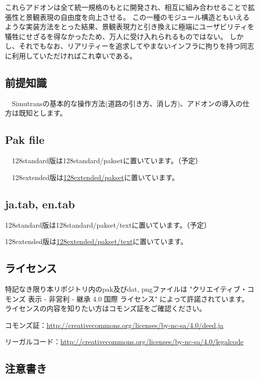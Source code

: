 \documentclass{jarticle}
\begin{document}
これらアドオンは全て統一規格のもとに開発され、相互に組み合わせることで拡張性と景観表現の自由度を向上させる。
この一種のモジュール構造ともいえるような実装方法をとった結果、景観表現力と引き換えに極端にユーザビリティを犠牲にせざるを得なかったため、万人に受け入れられるものではない。
しかし、それでもなお、リアリティーを追求してやまないインフラに拘りを持つ同志に利用していただければこれ幸いである。

\subsection*{前提知識}
　Simutransの基本的な操作方法(道路の引き方、消し方)、アドオンの導入の仕方は既知とします。

\subsection*{Pak file}
　128standard版は128standard/paksetに置いています。（予定）

　128extended版は\href{https://github.com/anoKTOK/Yokubari_roads_set_ver_anoKTOK/tree/main/128extended/pakset}{128extended/pakset}に置いています。

\subsection*{ja.tab, en.tab}
128standard版は128standard/pakset/textに置いています。（予定）

128extended版は\href{https://github.com/anoKTOK/Yokubari_roads_set_ver_anoKTOK/tree/main/128extended/pakset/text}{128extended/pakset/text}に置いています。


\subsection*{ライセンス}
特記なき限り本リポジトリ内のpak及びdat, pngファイルは
"クリエイティブ・コモンズ 表示 - 非営利 - 継承 4.0 国際 ライセンス"
によって許諾されています。ライセンスの内容を知りたい方はコモンズ証をご確認ください。

コモンズ証：\href{http://creativecommons.org/licenses/by-nc-sa/4.0/deed.ja}{http://creativecommons.org/licenses/by-nc-sa/4.0/deed.ja}

リーガルコード：\href{http://creativecommons.org/licenses/by-nc-sa/4.0/legalcode}{http://creativecommons.org/licenses/by-nc-sa/4.0/legalcode}

\subsection*{注意書き}
\end{document}
